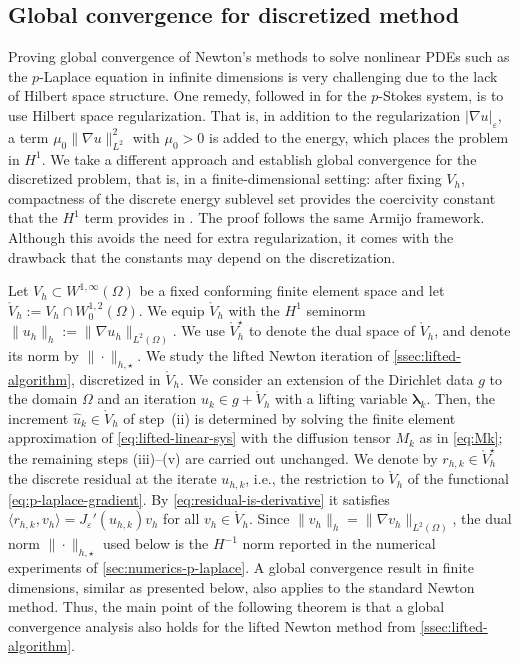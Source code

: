 \documentclass[11pt,pdflatex,sn-mathphys-num]{sn-jnl}
\theoremstyle{thmstyleone}%
\theoremstyle{thmstyletwo}%
\theoremstyle{thmstylethree}%
\newcommand{\bs}[1]{\ensuremath{\boldsymbol{#1}}}
\begin{document}
\subsection{Global convergence for discretized method}
\label{ssec:p-Lapl-convergence}
Proving global convergence of Newton's methods to solve nonlinear PDEs such as the $p$-Laplace equation in infinite dimensions is very challenging due to the lack of Hilbert space structure. One remedy, followed in \cite{schmidt-pStokes-global} for the $p$-Stokes system, is to use Hilbert space regularization. That is, 
in addition to the regularization $|\nabla u|_\varepsilon$, a term $\mu_0\|\nabla u\|_{L^2}^2$ with $\mu_0>0$ is added to the energy, which places the problem in $H^1$.
We take a different approach and establish global convergence for the discretized problem, that is, in a finite-dimensional setting: after fixing $V_h$, compactness of the discrete energy sublevel set provides the coercivity constant that the $H^1$ term provides in \cite{schmidt-pStokes-global}. The proof follows the same Armijo framework. Although this avoids the need for extra regularization, it comes with the drawback that the constants may depend on the discretization.


Let $V_h\subset W^{1,\infty}(\Omega)$ be a fixed conforming finite element space and let
$ \mathring{V}_h:=V_h\cap W_0^{1,2}(\Omega)$.
We equip $\mathring{V}_h$ with the $H^1$ seminorm
$\|u_h\|_h:=\|\nabla u_h\|_{L^2(\Omega)}$.
We use $\mathring{V}_h^\star$ to denote the dual space of $\mathring{V}_h$, and denote its norm by $\|\cdot\|_{h,\star}$.
We study the lifted Newton iteration of \cref{ssec:lifted-algorithm}, discretized in $\mathring{V}_h$. We consider an extension of the Dirichlet data $g$ to the domain $\Omega$ and an iteration $u_k\in g+\mathring{V}_h$ with a lifting variable $\bs\lambda_k$. Then, the increment $\hat u_k\in \mathring{V}_h$ of step~(ii) is determined by solving the finite element approximation of \eqref{eq:lifted-linear-sys} with the diffusion tensor
$M_k$ as in \eqref{eq:Mk}; the remaining steps (iii)--(v) are carried out unchanged. We denote by $r_{h,k}\in\mathring{V}_h^\star$ the discrete residual at the iterate $u_{h,k}$, i.e., the restriction to $\mathring{V}_h$ of the functional \eqref{eq:p-laplace-gradient}. By \eqref{eq:residual-is-derivative} it satisfies $\langle r_{h,k},v_h\rangle=J_\varepsilon'(u_{h,k})v_h$ for all $v_h\in\mathring{V}_h$. Since $\|v_h\|_h=\|\nabla v_h\|_{L^2(\Omega)}$, the dual norm $\|\cdot\|_{h,\star}$ used below is the $H^{-1}$ norm reported in the numerical experiments of \cref{sec:numerics-p-laplace}.
A global convergence result in finite dimensions, similar as presented below, also applies to the standard Newton method. Thus, the main point of the following theorem is that a global convergence analysis also holds for the lifted Newton method from \cref{ssec:lifted-algorithm}.
\end{document}
